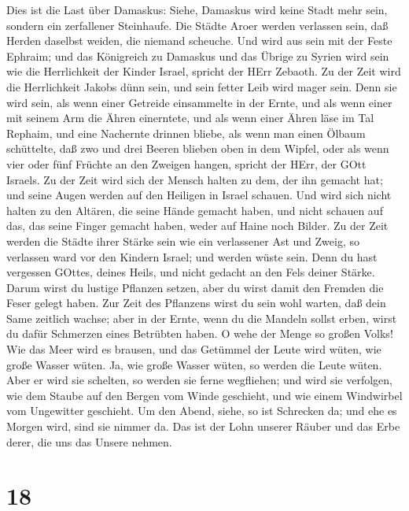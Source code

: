  Dies ist die Last über Damaskus: Siehe, Damaskus wird keine
Stadt mehr sein, sondern ein zerfallener Steinhaufe.  Die
Städte Aroer werden verlassen sein, daß Herden daselbst weiden, die
niemand scheuche.  Und wird aus sein mit der Feste Ephraim;
und das Königreich zu Damaskus und das Übrige zu Syrien wird sein wie
die Herrlichkeit der Kinder Israel, spricht der HErr Zebaoth.
 Zu der Zeit wird die Herrlichkeit Jakobs dünn sein, und
sein fetter Leib wird mager sein.  Denn sie wird sein, als
wenn einer Getreide einsammelte in der Ernte, und als wenn einer mit
seinem Arm die Ähren einerntete, und als wenn einer Ähren läse im Tal
Rephaim,  und eine Nachernte drinnen bliebe, als wenn man
einen Ölbaum schüttelte, daß zwo und drei Beeren blieben oben in dem
Wipfel, oder als wenn vier oder fünf Früchte an den Zweigen hangen,
spricht der HErr, der GOtt Israels.  Zu der Zeit wird sich
der Mensch halten zu dem, der ihn gemacht hat; und seine Augen werden
auf den Heiligen in Israel schauen.  Und wird sich nicht
halten zu den Altären, die seine Hände gemacht haben, und nicht schauen
auf das, das seine Finger gemacht haben, weder auf Haine noch Bilder.
 Zu der Zeit werden die Städte ihrer Stärke sein wie ein
verlassener Ast und Zweig, so verlassen ward vor den Kindern Israel; und
werden wüste sein.  Denn du hast vergessen GOttes, deines
Heils, und nicht gedacht an den Fels deiner Stärke. Darum wirst du
lustige Pflanzen setzen, aber du wirst damit den Fremden die Feser
gelegt haben.  Zur Zeit des Pflanzens wirst du sein wohl
warten, daß dein Same zeitlich wachse; aber in der Ernte, wenn du die
Mandeln sollst erben, wirst du dafür Schmerzen eines Betrübten haben.
 O wehe der Menge so großen Volks! Wie das Meer wird es
brausen, und das Getümmel der Leute wird wüten, wie große Wasser wüten.
 Ja, wie große Wasser wüten, so werden die Leute wüten.
Aber er wird sie schelten, so werden sie ferne wegfliehen; und wird sie
verfolgen, wie dem Staube auf den Bergen vom Winde geschieht, und wie
einem Windwirbel vom Ungewitter geschieht.  Um den Abend,
siehe, so ist Schrecken da; und ehe es Morgen wird, sind sie nimmer da.
Das ist der Lohn unserer Räuber und das Erbe derer, die uns das Unsere
nehmen.

\hypertarget{section-17}{%
\section{18}\label{section-17}}

